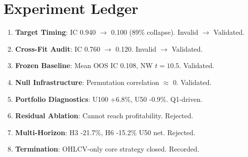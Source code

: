 \section{Experiment Ledger}
\begin{enumerate}
    \item \textbf{Target Timing}: IC 0.940 $\to$ 0.100 (89\% collapse). Invalid $\to$ Validated.
    \item \textbf{Cross-Fit Audit}: IC 0.760 $\to$ 0.120. Invalid $\to$ Validated.
    \item \textbf{Frozen Baseline}: Mean OOS IC 0.108, NW $t = 10.5$. Validated.
    \item \textbf{Null Infrastructure}: Permutation correlation $\approx$ 0. Validated.
    \item \textbf{Portfolio Diagnostics}: U100 +6.8\%, U50 -0.9\%. Q1-driven.
    \item \textbf{Residual Ablation}: Cannot reach profitability. Rejected.
    \item \textbf{Multi-Horizon}: H3 -21.7\%, H6 -15.2\% U50 net. Rejected.
    \item \textbf{Termination}: OHLCV-only core strategy closed. Recorded.
\end{enumerate}
